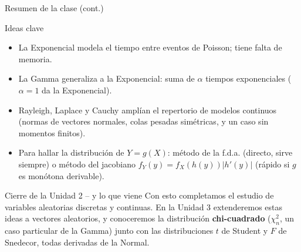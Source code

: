 \documentclass[aspectratio=169,11pt]{beamer}
\begin{document}
\begin{frame}{Resumen de la clase (cont.)}
\begin{block}{Ideas clave}
\begin{itemize}
\item La Exponencial modela el tiempo entre eventos de Poisson; tiene falta de memoria.
\item La Gamma generaliza a la Exponencial: suma de $\alpha$ tiempos exponenciales ($\alpha=1$ da la Exponencial).
\item Rayleigh, Laplace y Cauchy amplían el repertorio de modelos continuos (normas de vectores normales, colas pesadas simétricas, y un caso sin momentos finitos).
\item Para hallar la distribución de $Y=g(X)$: método de la f.d.a. (directo, sirve siempre) o método del jacobiano $f_Y(y)=f_X(h(y))|h'(y)|$ (rápido si $g$ es monótona derivable).
\end{itemize}
\end{block}

\begin{alertblock}{Cierre de la Unidad 2 -- y lo que viene}
Con esto completamos el estudio de variables aleatorias discretas y continuas. En la Unidad 3 extenderemos estas ideas a vectores aleatorios, y conoceremos la distribución \textbf{chi-cuadrado} ($\chi^2_n$, un caso particular de la Gamma) junto con las distribuciones $t$ de Student y $F$ de Snedecor, todas derivadas de la Normal.
\end{alertblock}
\end{frame}
\end{document}
